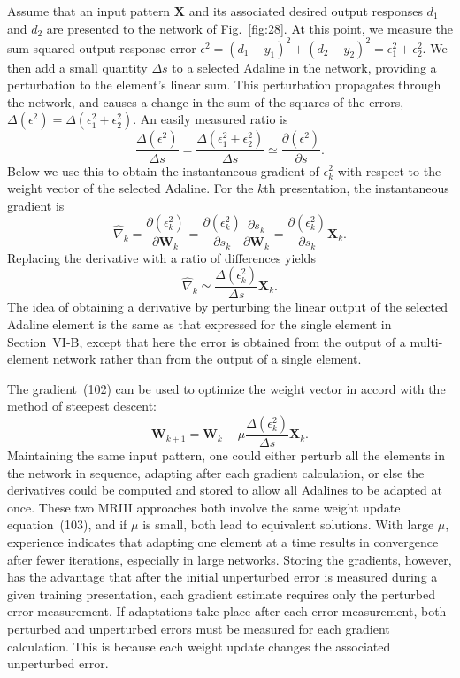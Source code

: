 \documentclass[10pt,twocolumn]{article}
\newcommand{\X}{\bm{X}}
\newcommand{\W}{\bm{W}}
\begin{document}
Assume that an input pattern $\X$ and its associated desired output responses $d_1$
and $d_2$ are presented to the network of Fig.~\ref{fig:28}. At this point, we
measure the sum squared output response error $\epsilon^2 = (d_1 - y_1)^2 + (d_2 -
y_2)^2 = \epsilon_1^2 + \epsilon_2^2$. We then add a small quantity $\Delta s$ to a
selected Adaline in the network, providing a perturbation to the element's linear
sum. This perturbation propagates through the network, and causes a change in the
sum of the squares of the errors, $\Delta(\epsilon^2) = \Delta(\epsilon_1^2 +
\epsilon_2^2)$. An easily measured ratio is
\begin{equation}
\frac{\Delta(\epsilon^2)}{\Delta s} = \frac{\Delta(\epsilon_1^2 + \epsilon_2^2)}{\Delta s}
\simeq \frac{\partial(\epsilon^2)}{\partial s}. \tag{100}
\end{equation}
Below we use this to obtain the instantaneous gradient of $\epsilon_k^2$ with respect
to the weight vector of the selected Adaline. For the $k$th presentation, the
instantaneous gradient is
\begin{equation}
\hat{\nabla}_k = \frac{\partial(\epsilon_k^2)}{\partial\W_k}
= \frac{\partial(\epsilon_k^2)}{\partial s_k}\frac{\partial s_k}{\partial\W_k}
= \frac{\partial(\epsilon_k^2)}{\partial s_k}\X_k. \tag{101}
\end{equation}
Replacing the derivative with a ratio of differences yields
\begin{equation}
\hat{\nabla}_k \simeq \frac{\Delta(\epsilon_k^2)}{\Delta s}\X_k. \tag{102}
\end{equation}
The idea of obtaining a derivative by perturbing the linear output of the selected
Adaline element is the same as that expressed for the single element in
Section~VI-B, except that here the error is obtained from the output of a
multi-element network rather than from the output of a single element.

The gradient~(102) can be used to optimize the weight vector in accord with the
method of steepest descent:
\begin{equation}
\W_{k+1} = \W_k - \mu\frac{\Delta(\epsilon_k^2)}{\Delta s}\X_k. \tag{103}
\end{equation}
Maintaining the same input pattern, one could either perturb all the elements in the
network in sequence, adapting after each gradient calculation, or else the
derivatives could be computed and stored to allow all Adalines to be adapted at
once. These two MRIII approaches both involve the same weight update equation~(103),
and if $\mu$ is small, both lead to equivalent solutions. With large $\mu$,
experience indicates that adapting one element at a time results in convergence
after fewer iterations, especially in large networks. Storing the gradients,
however, has the advantage that after the initial unperturbed error is measured
during a given training presentation, each gradient estimate requires only the
perturbed error measurement. If adaptations take place after each error measurement,
both perturbed and unperturbed errors must be measured for each gradient
calculation. This is because each weight update changes the associated unperturbed
error.
\end{document}
